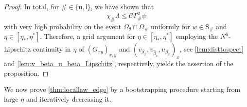 \documentclass[11pt]{article}
\theoremstyle{plain}
\theoremstyle{remark}
\numberwithin{equation}{section}
\newcommand*\ubarr[1]{{\widehat{#1}}}
\begin{document}
\begin{proof}
		In total, for $\# \in \{ \mathrm{u}, \mathrm{l}\}$, we have shown that
		\[ \chi_\# \Lambda \leq \mathcal C  \Gamma_\#^2 \psi\] 
		with very high probability on the event $\Omega_\theta\cap \Omega_{\#}$ 
		uniformly for $w \in \mathrm{S}_\#$ and $\eta \in [\eta_*, \eta^*]$. Therefore, a grid argument for $\eta \in [\eta_\ast, \eta^\ast]$ employing the $N^6$-Lipschitz continuity in $\eta$ of  $(G_{xy})_{x,y}$ and $(v_{\beta_x}, v_{\ubarr{\beta}_x},u_{\beta_x})_{x}$, see \cref{lem:disttospect} and \cref{lem:v_beta_u_beta_Lipschitz}, respectively, yields the assertion of the proposition.
		
	\end{proof}
	
	We now prove \cref{thm:locallaw_edge} by a bootstrapping procedure starting from large $\eta$ and iteratively decreasing it. 
	
\end{document}
